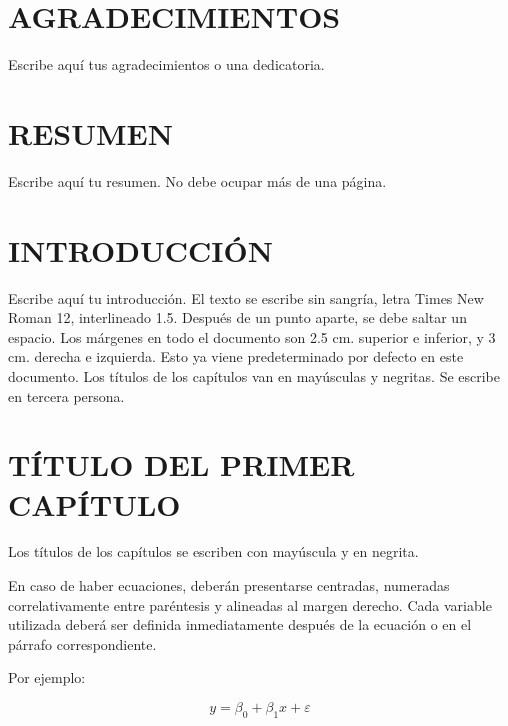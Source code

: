 \documentclass[12pt,oneside]{report}
\begin{document}
\setcounter{page}{1}
\setcounter{secnumdepth}{3}
\setcounter{tocdepth}{3}

\chapter*{AGRADECIMIENTOS}
Escribe aquí tus agradecimientos o una dedicatoria.

\tableofcontents
\listoftables
\listoffigures

\chapter*{RESUMEN}
Escribe aquí tu resumen. No debe ocupar más de una página.

\clearpage
{}
\setcounter{page}{1}

\chapter{INTRODUCCIÓN}

Escribe aquí tu introducción. El texto se escribe sin sangría, letra Times New Roman 12, interlineado 1.5. Después de un punto aparte, se debe saltar un espacio. Los márgenes en todo el documento son 2.5 cm. superior e inferior, y 3 cm. derecha e izquierda. Esto ya viene predeterminado por defecto en este documento. Los títulos de los capítulos van en mayúsculas y negritas. Se escribe en tercera persona.

\chapter{TÍTULO DEL PRIMER CAPÍTULO}
Los títulos de los capítulos se escriben con mayúscula y en negrita.

En caso de haber ecuaciones, deberán presentarse centradas, numeradas correlativamente entre paréntesis y alineadas al margen derecho. Cada variable utilizada deberá ser definida inmediatamente después de la ecuación o en el párrafo correspondiente.

Por ejemplo:

\begin{equation}
    y = \beta_0 + \beta_1x + \varepsilon
    \label{eq:regresion_lineal}
\end{equation}
\end{document}
